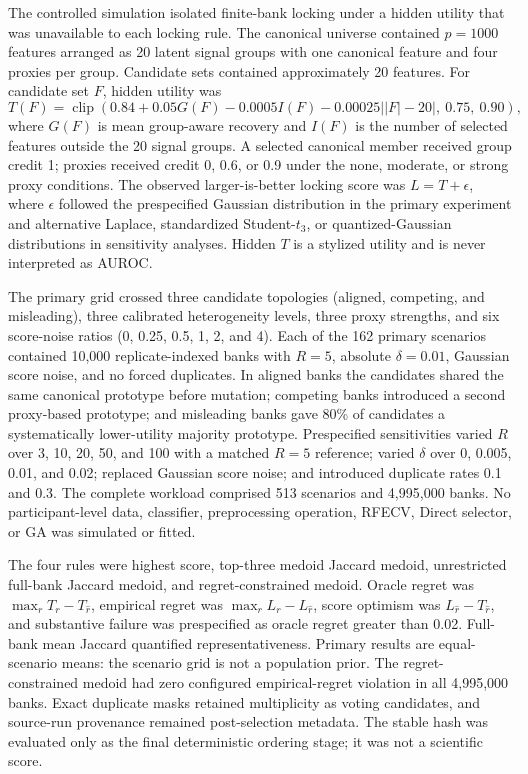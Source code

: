 The controlled simulation isolated finite-bank locking under a hidden utility that was unavailable to each locking rule. The canonical universe contained $p=1000$ features arranged as 20 latent signal groups with one canonical feature and four proxies per group. Candidate sets contained approximately 20 features. For candidate set $F$, hidden utility was
\begin{equation}
T(F)=\operatorname{clip}\left(0.84+0.05G(F)-0.0005I(F)-0.00025\left||F|-20\right|,\ 0.75,\ 0.90\right),
\end{equation}
where $G(F)$ is mean group-aware recovery and $I(F)$ is the number of selected features outside the 20 signal groups. A selected canonical member received group credit 1; proxies received credit 0, 0.6, or 0.9 under the none, moderate, or strong proxy conditions. The observed larger-is-better locking score was $L=T+\epsilon$, where $\epsilon$ followed the prespecified Gaussian distribution in the primary experiment and alternative Laplace, standardized Student-$t_3$, or quantized-Gaussian distributions in sensitivity analyses. Hidden $T$ is a stylized utility and is never interpreted as AUROC.

The primary grid crossed three candidate topologies (aligned, competing, and misleading), three calibrated heterogeneity levels, three proxy strengths, and six score-noise ratios (0, 0.25, 0.5, 1, 2, and 4). Each of the 162 primary scenarios contained 10,000 replicate-indexed banks with $R=5$, absolute $\delta=0.01$, Gaussian score noise, and no forced duplicates. In aligned banks the candidates shared the same canonical prototype before mutation; competing banks introduced a second proxy-based prototype; and misleading banks gave 80\% of candidates a systematically lower-utility majority prototype. Prespecified sensitivities varied $R$ over 3, 10, 20, 50, and 100 with a matched $R=5$ reference; varied $\delta$ over 0, 0.005, 0.01, and 0.02; replaced Gaussian score noise; and introduced duplicate rates 0.1 and 0.3. The complete workload comprised 513 scenarios and 4,995,000 banks. No participant-level data, classifier, preprocessing operation, RFECV, Direct selector, or GA was simulated or fitted.

The four rules were highest score, top-three medoid Jaccard medoid, unrestricted full-bank Jaccard medoid, and regret-constrained medoid. Oracle regret was $\max_rT_r-T_{\widehat r}$, empirical regret was $\max_rL_r-L_{\widehat r}$, score optimism was $L_{\widehat r}-T_{\widehat r}$, and substantive failure was prespecified as oracle regret greater than 0.02. Full-bank mean Jaccard quantified representativeness. Primary results are equal-scenario means: the scenario grid is not a population prior. The regret-constrained medoid had zero configured empirical-regret violation in all 4,995,000 banks. Exact duplicate masks retained multiplicity as voting candidates, and source-run provenance remained post-selection metadata. The stable hash was evaluated only as the final deterministic ordering stage; it was not a scientific score.

